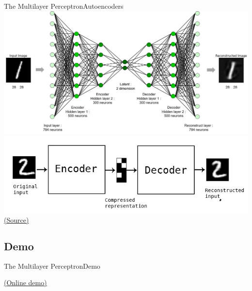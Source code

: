 \documentclass[10pt,compress]{beamer} %
\begin{document}
\begin{frame}{The Multilayer Perceptron}{Autoencoders}
	\centering\includegraphics[width=0.75\linewidth]{figs/autoencoder.png}\\\smallskip
	\centering\includegraphics[width=0.3\linewidth]{figs/autoencoder2.png}\\
	\scriptsize\href{https://blog.keras.io/building-autoencoders-in-keras.html}{(Source)}
\end{frame}

\subsection{Demo}
\begin{frame}{The Multilayer Perceptron}{Demo}
    \begin{center}
	\href{http://playground.tensorflow.org/}{(Online demo)}
    \end{center}
\end{frame}

\end{document}

